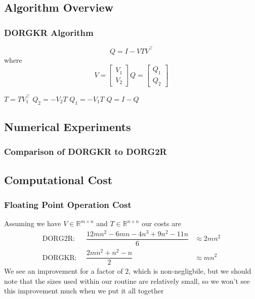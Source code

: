\documentclass[12pt]{beamer}
\newcommand{\R}{\mathbb{R}}
\begin{document}
    \subsection{Algorithm Overview}
    \begin{frame}
        \frametitle{DORGKR Algorithm}
        $$
            Q = I - VTV^\top
        $$ where
        $$
        V = \begin{bmatrix} V_1 \\ V_2 \end{bmatrix}
        Q = \begin{bmatrix} Q_1 \\ Q_2 \end{bmatrix}
        $$
        \begin{algorithmic}[1]
            \State $T = TV_1^\top$
            \State $Q_2 = -V_2T$
            \State $Q_1 = -V_1T$
            \State $Q = I - Q$
        \end{algorithmic}
    \end{frame}
    \subsection{Numerical Experiments}
    \begin{frame}
        \frametitle{Comparison of DORGKR to DORG2R}
    \end{frame}
    \subsection{Computational Cost}
    \begin{frame}
        \frametitle{Floating Point Operation Cost}
        Assuming we have $V\in\R^{m\times n}$ and $T\in\R^{n\times n}$ our costs are 
        $$
        \begin{aligned}
            \text{DORG2R: }&\, \dfrac{12mn^2 - 6mn -4n^3 +9n^2 - 11n}{6} &\approx 2mn^2\\
            \text{DORGKR: }&\, \dfrac{2mn^2 + n^2 - n}{2} &\approx mn^2
        \end{aligned}
        $$
        We see an improvement for a factor of $2$, which is non-negligbile, but we should note that the sizes
        used within our routine are relatively small, so we won't see this improvement much when we put it all together

        
    \end{frame}
\end{document}
